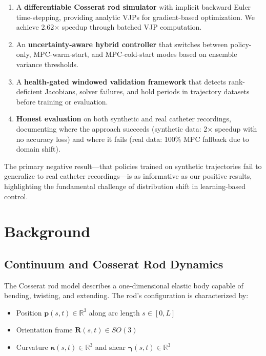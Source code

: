 \documentclass[conference]{IEEEtran}
\begin{document}
\begin{enumerate}
\item A \textbf{differentiable Cosserat rod simulator} with implicit backward Euler time-stepping, providing analytic VJPs for gradient-based optimization. We achieve 2.62$\times$ speedup through batched VJP computation.

\item An \textbf{uncertainty-aware hybrid controller} that switches between policy-only, MPC-warm-start, and MPC-cold-start modes based on ensemble variance thresholds.

\item A \textbf{health-gated windowed validation framework} that detects rank-deficient Jacobians, solver failures, and hold periods in trajectory datasets before training or evaluation.

\item \textbf{Honest evaluation} on both synthetic and real catheter recordings, documenting where the approach succeeds (synthetic data: 2$\times$ speedup with no accuracy loss) and where it fails (real data: 100\% MPC fallback due to domain shift).
\end{enumerate}

The primary negative result---that policies trained on synthetic trajectories fail to generalize to real catheter recordings---is as informative as our positive results, highlighting the fundamental challenge of distribution shift in learning-based control.

\section{Background}

\subsection{Continuum and Cosserat Rod Dynamics}

The Cosserat rod model describes a one-dimensional elastic body capable of bending, twisting, and extending. The rod's configuration is characterized by:
\begin{itemize}
\item Position $\mathbf{p}(s, t) \in \mathbb{R}^3$ along arc length $s \in [0, L]$
\item Orientation frame $\mathbf{R}(s, t) \in SO(3)$
\item Curvature $\boldsymbol{\kappa}(s, t) \in \mathbb{R}^3$ and shear $\boldsymbol{\gamma}(s, t) \in \mathbb{R}^3$
\end{itemize}
\end{document}
